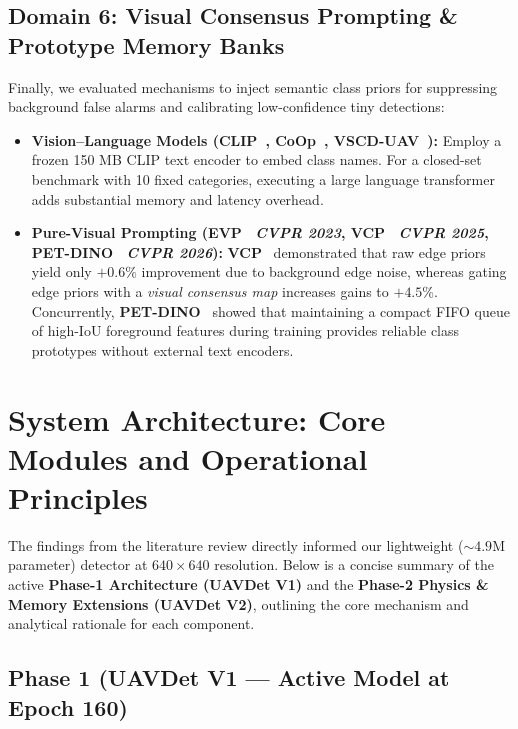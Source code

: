 \documentclass[11pt,a4paper]{article}
\begin{document}
\subsection{Domain 6: Visual Consensus Prompting \& Prototype Memory Banks}

Finally, we evaluated mechanisms to inject semantic class priors for suppressing background false alarms and calibrating low-confidence tiny detections:
\begin{itemize}[leftmargin=1.5em]
    \item \textbf{Vision--Language Models (CLIP~\cite{radford2021clip}, CoOp~\cite{zhou2022coop}, VSCD-UAV~\cite{yang2026vscduav}):} Employ a frozen 150 MB CLIP text encoder to embed class names. For a closed-set benchmark with 10 fixed categories, executing a large language transformer adds substantial memory and latency overhead.
    \item \textbf{Pure-Visual Prompting (EVP~\cite{liu2023evp} \emph{CVPR 2023}, VCP~\cite{wang2025vcp} \emph{CVPR 2025}, PET-DINO~\cite{fu2026petdino} \emph{CVPR 2026}):} \textbf{VCP}~\cite{wang2025vcp} demonstrated that raw edge priors yield only $+0.6\%$ improvement due to background edge noise, whereas gating edge priors with a \emph{visual consensus map} increases gains to $+4.5\%$. Concurrently, \textbf{PET-DINO}~\cite{fu2026petdino} showed that maintaining a compact FIFO queue of high-IoU foreground features during training provides reliable class prototypes without external text encoders.
\end{itemize}

\section{System Architecture: Core Modules and Operational Principles}

The findings from the literature review directly informed our lightweight ($\sim 4.9\text{M}$ parameter) detector at $640\times 640$ resolution. Below is a concise summary of the active \textbf{Phase-1 Architecture (UAVDet V1)} and the \textbf{Phase-2 Physics \& Memory Extensions (UAVDet V2)}, outlining the core mechanism and analytical rationale for each component.

\subsection{Phase 1 (UAVDet V1 --- Active Model at Epoch 160)}
\end{document}
